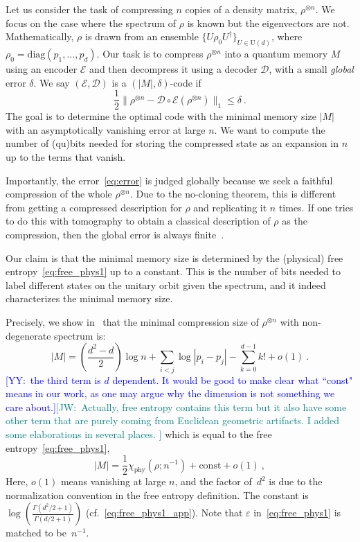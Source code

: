 \documentclass[aps,pre,twocolumn,superscriptaddress,amsmath,amssymb,reprint]{revtex4-2}
\def\eps{\varepsilon}
\def\D{\mathcal{D}}
\def\E{\mathcal{E}}
\newcommand{\JW}[1]{\textcolor{teal}{[JW:\ #1]}}
\newcommand{\YY}[1]{\textcolor{blue}{[YY:\ #1]}}
\begin{document}
Let us consider the task of compressing $n$ copies of a density matrix, $\rho^{\otimes n}$. We focus on the case where the spectrum of $\rho$ is known but the eigenvectors are not. Mathematically, $\rho$ is drawn from an ensemble $\{U\rho_0 U^\dagger\}_{U\in\mathrm{U}(d)}$, where $\rho_0 = \mathrm{diag}(p_1,\ldots,p_d)$. Our task is to compress $\rho^{\otimes n}$ into a quantum memory $M$ using an encoder $\E$ and then decompress it using a decoder $\D$, with a small \emph{global} error $\delta$. We say $(\E,\D)$ is a $(|M|,\delta)$-code if
\begin{equation}\label{eq:error}
    \frac12\|\rho^{\otimes n}-\D\circ\E(\rho^{\otimes n})\|_1\le\delta\ .
\end{equation} 
The goal is to determine the optimal code with the minimal memory size $|M|$ with an asymptotically vanishing error at large $n$. We want to compute the number of (qu)bits needed for storing the compressed state as an expansion in $n$ up to the terms that vanish. 

Importantly, the error~\eqref{eq:error} is judged globally because we seek a faithful compression of the whole $\rho^{\otimes n}$. Due to the no-cloning theorem, this is different from getting a compressed description for $\rho$ and replicating it $n$ times. If one tries to do this with tomography to obtain a classical description of $\rho$ as the compression, then the global error is always finite~\cite{yang2018compression}.

Our claim is that the minimal memory size is determined by the (physical) free entropy~\eqref{eq:free_phys1} up to a constant. This is the number of bits needed to label different states on the unitary orbit given the spectrum, and it indeed characterizes the minimal memory size. 

Precisely, we show in~\cite{paper2} that the minimal compression size of $\rho^{\otimes n}$ with non-degenerate spectrum is:
\begin{equation}\label{eq:result_qmdl}
    |M| = \left(\frac{d^2-d}{2}\right)\log n +\sum_{i< j} \log|p_i-p_j| -\sum_{k=0}^{d-1}k!+o(1)\ .
\end{equation}
\YY{the third term is $d$ dependent. It would be good to make clear what ``const" means in our work, as one may argue why the dimension is not something we care about.}\JW{Actually, free entropy contains this term but it also have some other term that are purely coming from Euclidean geometric artifacts. I added some elaborations in several places. } which is equal to the free entropy~\eqref{eq:free_phys1},
\begin{equation}\label{eq:result}
   |M| = \frac12\chi_\mathrm{phy}(\rho;n^{-1}) + \mathrm{const} + o(1)\ ,
\end{equation}
Here, $o(1)$ means vanishing at large $n$, and the factor of~$d^2$ is due to the normalization convention in the free entropy definition. The constant is $\log \left( \frac{\Gamma(d^2/2 + 1)}{\Gamma(d/2 + 1)}\right)$ (cf.~\eqref{eq:free_phys1_app}). Note that $\eps$ in~\eqref{eq:free_phys1} is matched to be~$n^{-1}$. 
\end{document}
